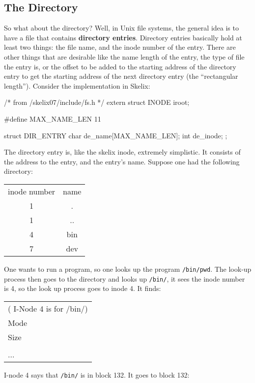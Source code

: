 \subsection{The Directory}

So what about the directory? Well, in Unix file systems, the general idea is to have a file that contains \textbf{directory entries}. Directory entries basically hold at least two things: 
the file name, 
and the inode number of the entry. 
There are other things that are desirable like the name length of the entry, the type of file the entry is, or the offset to be added to the starting address of the directory entry to get the starting address of the next directory entry (the ``rectangular length''). Consider the implementation in Skelix:


\begin{code}[numbers=left,firstnumber=15]
/* from /skelix07/include/fs.h */
extern struct INODE iroot;

#define MAX_NAME_LEN 11

struct DIR_ENTRY {
	char de_name[MAX_NAME_LEN];
	int de_inode;
};
\end{code}
The directory entry is, like the skelix inode, extremely simplistic. It consists of the address to the entry, and the entry's name. Suppose one had the following directory:

\begin{tabular}{cc}
 \textrm{inode number} & \textrm{name} \\
 1  & . \\
 1 & .. \\
 4 & \textrm{bin} \\
 7 & \textrm{dev} 
\end{tabular}

One wants to run a program, so one looks up the program \verb|/bin/pwd|. The look-up process then goes to the directory and looks up \verb|/bin/|, it sees the inode number is 4, so the look up process goes to inode 4. It finds:

\begin{tabular}{l} \\
(\textrm{ I-Node 4 is for /bin/}) \\
\textrm{Mode} \\
\textrm{Size} \\
 \\
...
\end{tabular}

I-node 4 says that \verb|/bin/| is in block 132. It goes to block 132:

